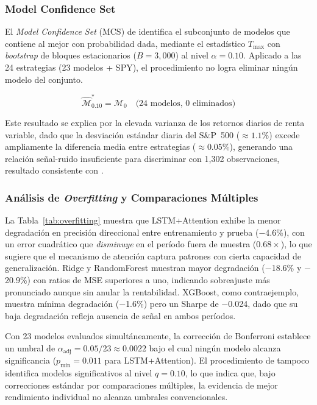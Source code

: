\subsubsection{Model Confidence Set}
\label{subsec:mcs}

El \textit{Model Confidence Set} (MCS) de \citet{hansen2011} identifica el subconjunto de modelos que contiene al mejor con probabilidad dada, mediante el estad\'istico $T_{\max}$ con \textit{bootstrap} de bloques estacionarios ($B = 3{,}000$) al nivel $\alpha = 0.10$. Aplicado a las 24 estrategias (23 modelos + SPY), el procedimiento no logra eliminar ning\'un modelo del conjunto.

\begin{equation}
\hat{\mathcal{M}}^*_{0.10} = \mathcal{M}_0 \quad \text{(24 modelos, 0 eliminados)}
\label{eq:mcs_result}
\end{equation}

Este resultado se explica por la elevada varianza de los retornos diarios de renta variable, dado que la desviaci\'on est\'andar diaria del S\&P~500 ($\approx 1.1\%$) excede ampliamente la diferencia media entre estrategias ($\approx 0.05\%$), generando una relaci\'on se\~nal-ruido insuficiente para discriminar con 1{,}302 observaciones, resultado consistente con \citet{hansen2011}.

\subsubsection{An\'alisis de \textit{Overfitting} y Comparaciones M\'ultiples}
\label{subsec:overfitting}

La Tabla~\ref{tab:overfitting} muestra que LSTM+Attention exhibe la menor degradaci\'on en precisi\'on direccional entre entrenamiento y prueba ($-$4.6\%), con un error cuadr\'atico que \textit{disminuye} en el per\'iodo fuera de muestra ($0.68\times$), lo que sugiere que el mecanismo de atenci\'on captura patrones con cierta capacidad de generalizaci\'on. Ridge y RandomForest muestran mayor degradaci\'on ($-$18.6\% y $-$20.9\%) con ratios de MSE superiores a uno, indicando sobreajuste m\'as pronunciado aunque sin anular la rentabilidad. XGBoost, como contraejemplo, muestra m\'inima degradaci\'on ($-$1.6\%) pero un Sharpe de $-$0.024, dado que su baja degradaci\'on refleja ausencia de se\~nal en ambos per\'iodos.

Con 23 modelos evaluados simult\'aneamente, la correcci\'on de Bonferroni establece un umbral de $\alpha_{\text{adj}} = 0.05/23 \approx 0.0022$ bajo el cual ning\'un modelo alcanza significancia ($p_{\min} = 0.011$ para LSTM+Attention). El procedimiento de \citet{benjamini1995controlling} tampoco identifica modelos significativos al nivel $q = 0.10$, lo que indica que, bajo correcciones est\'andar por comparaciones m\'ultiples, la evidencia de mejor rendimiento individual no alcanza umbrales convencionales.

